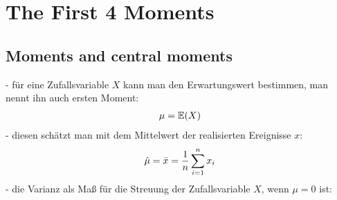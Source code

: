 \section{The First 4 Moments}

\subsection{Moments and central moments}
- für eine Zufallsvariable $X$ kann man den Erwartungswert bestimmen, man nennt ihn auch ersten Moment:
\begin{align}
    \mu = \mathbb{E}(X)\notag
\end{align}
- diesen schätzt man mit dem Mittelwert der realisierten Ereignisse $x$:
\begin{align}
    \hat{\mu} = \bar{x} = \frac{1}{n}\sum_{i=1}^{n}x_i\notag
\end{align}
- die Varianz als Maß für die Streuung der Zufallsvariable $X$, wenn $\mu=0$ ist:
